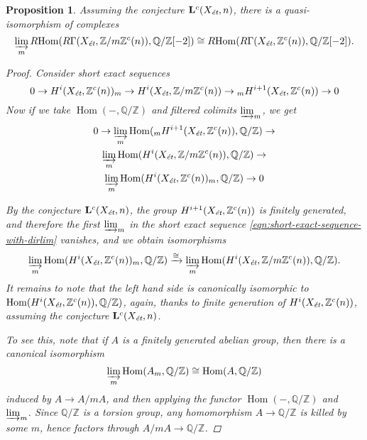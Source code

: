\documentclass[leqno,12pt]{article}
\theoremstyle{plain}
\newtheorem{proposition}[theorem]{\indent\sc Proposition}
\theoremstyle{definition}
\DeclareMathOperator{\Hom}{Hom}
\newcommand{\QQ}{\mathbb{Q}}
\newcommand{\ZZ}{\mathbb{Z}}
\newcommand{\et}{\text{\it \'{e}t}}
\newcommand{\RHom}{R\!\Hom}
\begin{document}
\begin{proposition}
  \label{prop:a-quasi-isomorphism-with-dirlim}
  Assuming the conjecture $\mathbf{L}^c (X_\et, n)$, there is
  a quasi-isomorphism of complexes
  \[ \varinjlim_m \RHom (R\Gamma (X_\et, \ZZ/m\ZZ^c (n)), \QQ/\ZZ [-2]) \cong
  \RHom (R\Gamma (X_\et, \ZZ^c (n)), \QQ/\ZZ [-2]). \]

  \begin{proof}
    Consider short exact sequences
    \[ 0 \to H^i (X_\et, \ZZ^c (n))_m \to
      H^i (X_\et, \ZZ/m\ZZ^c (n)) \to
      {}_m H^{i+1} (X_\et, \ZZ^c (n)) \to 0 \]
    Now if we take $\Hom (-,\QQ/\ZZ)$ and filtered colimits $\varinjlim_m$,
    we get
    \begin{multline}
      \label{eqn:short-exact-sequence-with-dirlim}
      0 \to \varinjlim_m \Hom ({}_m H^{i+1} (X_\et, \ZZ^c (n)), \QQ/\ZZ) \to \\
      \varinjlim_m \Hom (H^i (X_\et, \ZZ/m\ZZ^c (n)), \QQ/\ZZ) \to \\
      \varinjlim_m \Hom (H^i (X_\et, \ZZ^c (n))_m, \QQ/\ZZ) \to 0
    \end{multline}

    By the conjecture $\mathbf{L}^c (X_\et, n)$, the group
    $H^{i+1} (X_\et, \ZZ^c (n))$ is finitely generated, and therefore
    the first $\varinjlim_m$ in the short exact sequence
    \eqref{eqn:short-exact-sequence-with-dirlim} vanishes, and we obtain
    isomorphisms
    \[ \varinjlim_m \Hom (H^i (X_\et, \ZZ^c (n))_m, \QQ/\ZZ) \xrightarrow{\cong}
      \varinjlim_m \Hom (H^i (X_\et, \ZZ/m\ZZ^c (n)), \QQ/\ZZ). \]
    It remains to note that the left hand side is canonically isomorphic to
    $\Hom (H^i (X_\et, \ZZ^c (n)), \QQ/\ZZ)$, again, thanks to finite generation
    of $H^i (X_\et, \ZZ^c (n))$, assuming the conjecture
    $\mathbf{L}^c (X_\et, n)$.

    To see this, note that if $A$ is a finitely generated abelian group, then
    there is a canonical isomorphism
    $$\varinjlim_m \Hom (A_m, \QQ/\ZZ) \cong \Hom (A, \QQ/\ZZ)$$
    induced by $A \to A/m A$, and then applying the functor $\Hom (-, \QQ/\ZZ)$
    and $\varinjlim_m$. Since $\QQ/\ZZ$ is a torsion group, any homomorphism
    $A\to \QQ/\ZZ$ is killed by some $m$, hence factors through
    $A/mA \to \QQ/\ZZ$.
  \end{proof}
\end{proposition}

\end{document}
